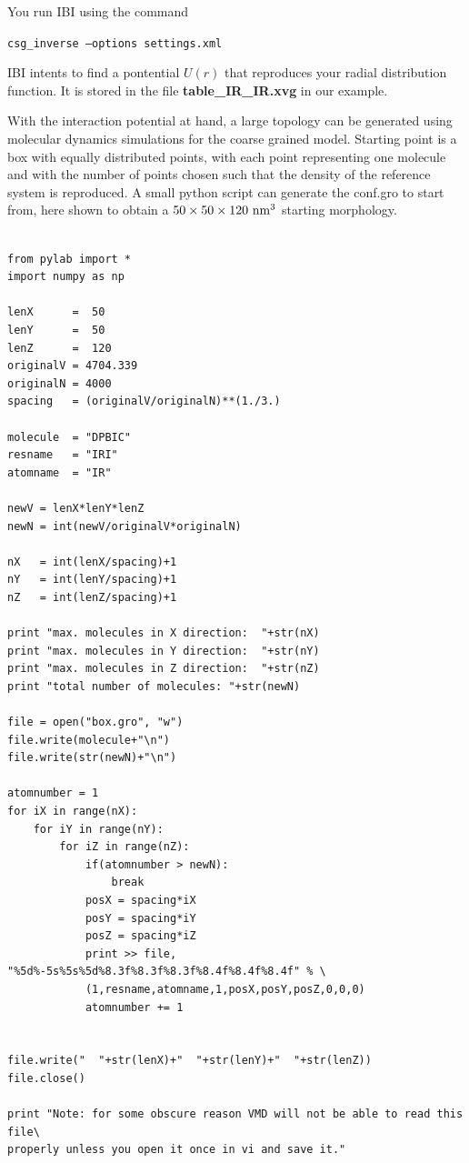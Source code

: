You run IBI using the command

\texttt{csg\_inverse --options settings.xml}

IBI intents to find a pontential $U(r)$ that reproduces your radial distribution function. It is stored in the file \textbf{table\_IR\_IR.xvg} in our example.

With the interaction potential at hand, a large topology can be generated using molecular dynamics simulations for the coarse grained model. Starting point is a box with equally distributed points, with each point representing one molecule and with the number of points chosen such that the density of the reference system is reproduced. A small python script can generate the conf.gro to start from, here shown to obtain a $50\times50\times120~{\rm nm}^3$ starting morphology.

\lstset{language=Python}
\begin{lstlisting}

from pylab import *
import numpy as np

lenX      =  50
lenY      =  50 
lenZ      =  120 
originalV = 4704.339 
originalN = 4000
spacing   = (originalV/originalN)**(1./3.) 

molecule  = "DPBIC"
resname   = "IRI"
atomname  = "IR"

newV = lenX*lenY*lenZ
newN = int(newV/originalV*originalN)

nX   = int(lenX/spacing)+1
nY   = int(lenY/spacing)+1
nZ   = int(lenZ/spacing)+1

print "max. molecules in X direction:  "+str(nX)
print "max. molecules in Y direction:  "+str(nY)
print "max. molecules in Z direction:  "+str(nZ)
print "total number of molecules: "+str(newN)

file = open("box.gro", "w")
file.write(molecule+"\n")
file.write(str(newN)+"\n")

atomnumber = 1
for iX in range(nX):
    for iY in range(nY):
        for iZ in range(nZ):
            if(atomnumber > newN):
                break
            posX = spacing*iX
            posY = spacing*iY
            posZ = spacing*iZ
            print >> file, "%5d%-5s%5s%5d%8.3f%8.3f%8.3f%8.4f%8.4f%8.4f" % \
            (1,resname,atomname,1,posX,posY,posZ,0,0,0)
            atomnumber += 1


file.write("  "+str(lenX)+"  "+str(lenY)+"  "+str(lenZ))
file.close()

print "Note: for some obscure reason VMD will not be able to read this file\
properly unless you open it once in vi and save it."


\end{lstlisting}

